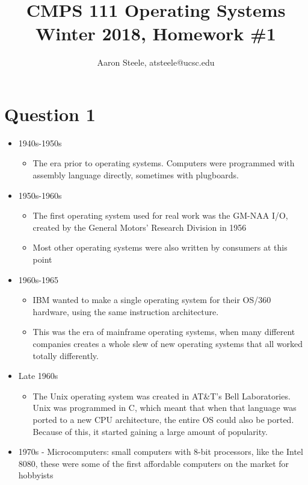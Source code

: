 \documentclass[12pt]{article}
\title{\textbf{CMPS 111 Operating Systems\\ Winter 2018, Homework \#1}}
\date{}
\author{Aaron Steele, atsteele@ucsc.edu}
\begin{document}

  \maketitle
  
  \section*{Question 1}
  
  \begin{itemize}
  	\item 1940s-1950s
  	\begin{itemize}
  		\item The era prior to operating systems. Computers were programmed with assembly language directly, sometimes with plugboards.
  	\end{itemize}
  	\item 1950s-1960s
  	\begin{itemize}
  		\item The first operating system used for real work was the GM-NAA I/O, created by the General Motors' Research Division in 1956
  		\item Most other operating systems were also written by consumers at this point
  	\end{itemize}
  	\item 1960s-1965
  	\begin{itemize}
  		\item IBM wanted to make a single operating system for their OS/360 hardware, using the same instruction architecture.
  		\item This was the era of mainframe operating systems, when many different companies creates a whole slew of new operating systems that all worked totally differently.
  	\end{itemize}
	\item Late 1960s
	\begin{itemize}
	  	\item The Unix operating system was created in AT\&T's Bell Laboratories. Unix was programmed in C, which meant that when that language was ported to a new CPU architecture, the entire OS could also be ported. Because of this, it started gaining a large amount of popularity.
	\end{itemize}
	\item 1970s - Microcomputers: small computers with 8-bit processors, like the Intel 8080, these were some of the first affordable computers on the market for hobbyists

\end{itemize}
\end{document}
